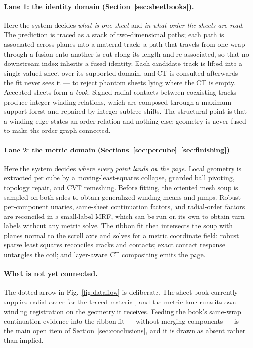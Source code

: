 \paragraph{Lane 1: the identity domain (Section~\ref{sec:sheetbooks}).} Here the system decides \emph{what is one sheet} and \emph{in what order the sheets are read}. The prediction is traced as a stack of two-dimensional paths; each path is associated across planes into a material track; a path that travels from one wrap through a fusion onto another is cut along its length and re-associated, so that no downstream index inherits a fused identity. Each candidate track is lifted into a single-valued sheet over its supported domain, and CT is consulted afterwards --- the fit never sees it --- to reject phantom sheets lying where the CT is empty. Accepted sheets form a \emph{book}. Signed radial contacts between coexisting tracks produce integer winding relations, which are composed through a maximum-support forest and repaired by integer subtree shifts. The structural point is that a winding edge states an order relation and nothing else: geometry is never fused to make the order graph connected.

\paragraph{Lane 2: the metric domain (Sections~\ref{sec:percube}--\ref{sec:finishing}).} Here the system decides \emph{where every point lands on the page}. Local geometry is extracted per cube by a moving-least-squares collapse, guarded ball pivoting, topology repair, and CVT remeshing. Before fitting, the oriented mesh soup is sampled on both sides to obtain generalized-winding means and jumps. Robust per-component unaries, same-sheet continuation factors, and radial-order factors are reconciled in a small-label MRF, which can be run on its own to obtain turn labels without any metric solve. The ribbon fit then intersects the soup with planes normal to the scroll axis and solves for a metric coordinate field; robust sparse least squares reconciles cracks and contacts; exact contact response untangles the coil; and layer-aware CT compositing emits the page.

\paragraph{What is not yet connected.} The dotted arrow in Fig.~\ref{fig:dataflow} is deliberate. The sheet book currently supplies radial order for the traced material, and the metric lane runs its own winding registration on the geometry it receives. Feeding the book's same-wrap continuation evidence into the ribbon fit --- without merging components --- is the main open item of Section~\ref{sec:conclusions}, and it is drawn as absent rather than implied.

